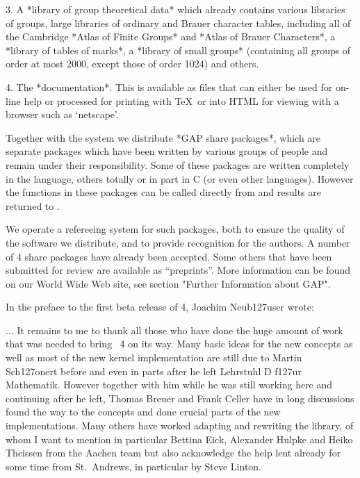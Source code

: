   \item{3.}  
    A *library of group theoretical data* which already contains
    various libraries of groups, large libraries of ordinary and
    Brauer  character tables,   including  all of the   Cambridge *Atlas of
    Finite Groups*  and *Atlas of Brauer Characters*,  a *library of tables
    of marks*, a *library of small groups* (containing  all groups of order
    at most 2000, except those of order 1024) and others.


  \item{4.}
    The *documentation*.  This is available as files that can either be
    used for on-line  help or processed for printing with \TeX\ or into
    HTML for viewing with a browser such as `netscape'.
\endlist

Together  with the system we distribute  *GAP  share packages*, which are
separate packages which have been written by various groups of people and
remain  under their responsibility.  Some  of  these packages are written
completely in the {\GAP}  language, others totally   or in part in  C (or
even  other languages).  However the functions   in these packages can be
called directly from {\GAP} and results are returned to {\GAP}.

We  operate a refereeing  system  for such packages,  both  to ensure the
quality of the software we distribute, and to provide recognition for the
authors.    A  number of  {\GAP}   4  share   packages  have already been
accepted. Some others  that have been submitted  for review are available
as  ``preprints''. More information  can be found on   our World Wide Web
site, see section "Further Information about GAP".


In the preface to the first beta release of {\GAP} 4, Joachim Neub\accent127user wrote:

\begingroup\advance\leftskip 0.5in\advance\rightskip 0.5in%

   $\ldots$  It remains to me to  thank all those  who have done the huge
   amount of work that  was needed to  bring  {\GAP}~4 on its  way.  Many
   basic ideas for  the new concepts as  well  as most of the  new kernel
   implementation are still due  to Martin Sch\accent127onert  before and
   even  in parts  after  he left  Lehrstuhl D  f\accent127ur Mathematik.
   However   together with  him  while   he  was still  working  here and
   continuing after he left, Thomas Breuer and  Frank Celler have in long
   discussions found  the way to  the concepts and  done crucial parts of
   the  new  implementations.   Many  others  have  worked  adapting  and
   rewriting the library, of whom I want to mention in particular Bettina
   Eick, Alexander  Hulpke and Heiko  Theissen  from the Aachen  team but
   also   acknowledge   the help  lent   already  for  some  time  from
   St.~Andrews, in particular by Steve Linton.


